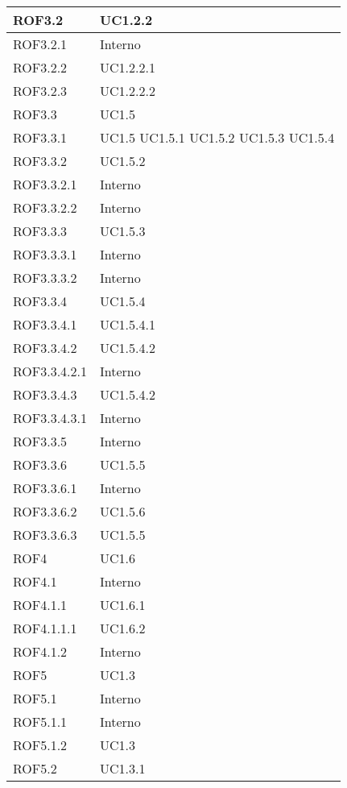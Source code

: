 \begin{center}
\begin{longtable}{| p{4cm} | p{4cm} |}
ROF3.2   &  UC1.2.2 \\
\hline
ROF3.2.1   &  Interno \\
\hline
ROF3.2.2   &  UC1.2.2.1 \\
\hline
ROF3.2.3   &  UC1.2.2.2 \\
\hline
ROF3.3   &  UC1.5 \\
\hline
ROF3.3.1   &  UC1.5 \newline UC1.5.1 \newline UC1.5.2 \newline UC1.5.3 \newline UC1.5.4 \\
\hline
ROF3.3.2   &  UC1.5.2 \\
\hline
ROF3.3.2.1   &  Interno \\
\hline
ROF3.3.2.2   &  Interno \\
\hline
ROF3.3.3   &  UC1.5.3 \\
\hline
ROF3.3.3.1   &  Interno \\
\hline
ROF3.3.3.2   &  Interno \\
\hline
ROF3.3.4   &  UC1.5.4 \\
\hline
ROF3.3.4.1   &  UC1.5.4.1 \\
\hline
ROF3.3.4.2   &  UC1.5.4.2 \\
\hline
ROF3.3.4.2.1   &  Interno \\
\hline
ROF3.3.4.3   &  UC1.5.4.2 \\
\hline
ROF3.3.4.3.1   &  Interno \\
\hline
ROF3.3.5   &  Interno \\
\hline
ROF3.3.6   &  UC1.5.5 \\
\hline
ROF3.3.6.1   &  Interno \\
\hline
ROF3.3.6.2   &  UC1.5.6 \\
\hline
ROF3.3.6.3   &  UC1.5.5 \\
\hline
ROF4   &  UC1.6 \\
\hline
ROF4.1   &  Interno \\
\hline
ROF4.1.1   &  UC1.6.1 \\
\hline
ROF4.1.1.1   &  UC1.6.2 \\
\hline
ROF4.1.2   &  Interno \\
\hline
ROF5   &  UC1.3 \\
\hline
ROF5.1   &  Interno \\
\hline
ROF5.1.1   &  Interno \\
\hline
ROF5.1.2   &  UC1.3 \\
\hline
ROF5.2   &  UC1.3.1 \\

\end{longtable}
\end{center}
